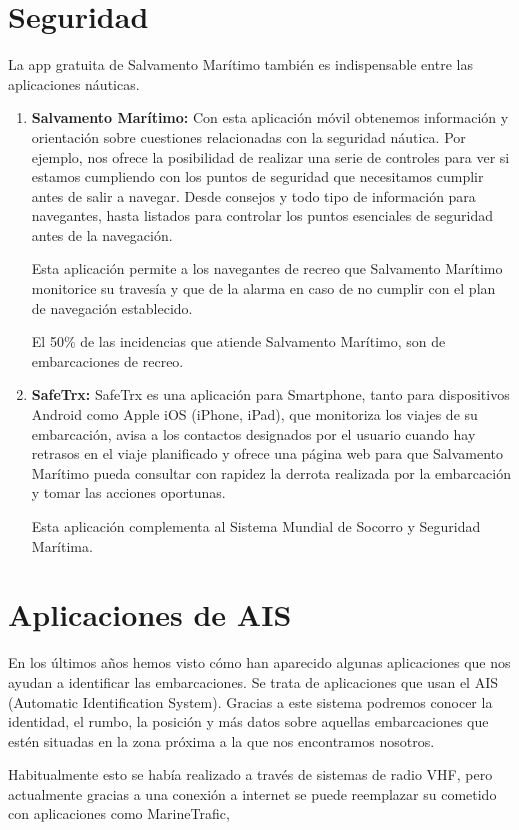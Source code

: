 \section{Seguridad}
La app gratuita de Salvamento Marítimo también es indispensable entre
las aplicaciones náuticas.
\begin{enumerate}
\item \textbf{Salvamento Marítimo:} Con esta aplicación móvil
  obtenemos información y orientación sobre cuestiones relacionadas
  con la seguridad náutica. Por ejemplo, nos ofrece la posibilidad de
  realizar una serie de controles para ver si estamos cumpliendo con
  los puntos de seguridad que necesitamos cumplir antes de salir a
  navegar. Desde consejos y todo tipo de información para navegantes,
  hasta listados para controlar los puntos esenciales de seguridad
  antes de la navegación.

  Esta aplicación permite a los navegantes de recreo que Salvamento
  Marítimo monitorice su travesía y que de la alarma en caso de no
  cumplir con el plan de navegación establecido.

  El 50\% de las incidencias que atiende Salvamento Marítimo, son de
  embarcaciones de recreo.

\item \textbf{SafeTrx:} SafeTrx es una aplicación para Smartphone,
  tanto para dispositivos Android como Apple iOS (iPhone, iPad), que
  monitoriza los viajes de su embarcación, avisa a los contactos
  designados por el usuario cuando hay retrasos en el viaje
  planificado y ofrece una página web para que Salvamento Marítimo
  pueda consultar con rapidez la derrota realizada por la embarcación
  y tomar las acciones oportunas.

  Esta aplicación complementa al Sistema Mundial de Socorro y
  Seguridad Marítima.
\end{enumerate}

\section{Aplicaciones de AIS}
En los últimos años hemos visto cómo han aparecido algunas
aplicaciones que nos ayudan a identificar las embarcaciones. Se trata
de aplicaciones que usan el AIS (Automatic Identification
System). Gracias a este sistema podremos conocer la identidad, el
rumbo, la posición y más datos sobre aquellas embarcaciones que estén
situadas en la zona próxima a la que nos encontramos nosotros.

Habitualmente esto se había realizado a través de sistemas de radio
VHF, pero actualmente gracias a una conexión a internet se puede
reemplazar su cometido con aplicaciones como MarineTrafic,

